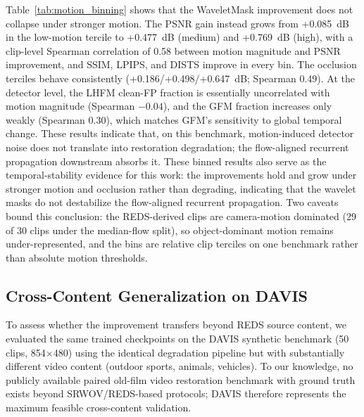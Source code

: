 Table~\ref{tab:motion_binning} shows that the WaveletMask improvement does not collapse under stronger motion. The PSNR gain instead grows from +0.085~dB in the low-motion tercile to +0.477~dB (medium) and +0.769~dB (high), with a clip-level Spearman correlation of 0.58 between motion magnitude and PSNR improvement, and SSIM, LPIPS, and DISTS improve in every bin. The occlusion terciles behave consistently (+0.186/+0.498/+0.647~dB; Spearman 0.49). At the detector level, the LHFM clean-FP fraction is essentially uncorrelated with motion magnitude (Spearman $-0.04$), and the GFM fraction increases only weakly (Spearman 0.30), which matches GFM's sensitivity to global temporal change. These results indicate that, on this benchmark, motion-induced detector noise does not translate into restoration degradation; the flow-aligned recurrent propagation downstream absorbs it. These binned results also serve as the temporal-stability evidence for this work: the improvements hold and grow under stronger motion and occlusion rather than degrading, indicating that the wavelet masks do not destabilize the flow-aligned recurrent propagation. Two caveats bound this conclusion: the REDS-derived clips are camera-motion dominated (29 of 30 clips under the median-flow split), so object-dominant motion remains under-represented, and the bins are relative clip terciles on one benchmark rather than absolute motion thresholds.

\subsection{Cross-Content Generalization on DAVIS}\label{subsec:davis}

To assess whether the improvement transfers beyond REDS source content, we evaluated the same trained checkpoints on the DAVIS synthetic benchmark (50 clips, 854$\times$480) using the identical degradation pipeline but with substantially different video content (outdoor sports, animals, vehicles). To our knowledge, no publicly available paired old-film video restoration benchmark with ground truth exists beyond SRWOV/REDS-based protocols; DAVIS therefore represents the maximum feasible cross-content validation.

